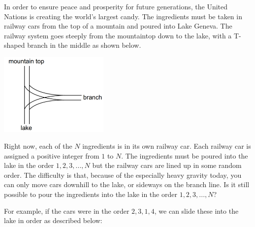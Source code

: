 
In order to ensure peace and prosperity for future generations, the United Nations is creating the
world's largest candy. The ingredients must be taken in railway cars from the top of a mountain and
poured into Lake Geneva. The railway system goes steeply from the mountaintop down to the lake, with
a T-shaped branch in the middle as shown below.

\begin{center}
\includegraphics[width=0.4\textwidth]{confection}
\end{center}

Right now, each of the $N$ ingredients is in its own railway car. Each railway car is assigned a
positive integer from $1$ to $N$. The ingredients must be poured into the lake in the order $1, 2,
3, ..., N$ but the railway cars are lined up in some random order. The difficulty is that, because
of the especially heavy gravity today, you can only move cars downhill to the lake, or sideways on
the branch line. Is it still possible to pour the ingredients into the lake in the order $1, 2, 3,
..., N$?

For example, if the cars were in the order $2, 3, 1, 4$, we can slide these into the lake in order as described below:

